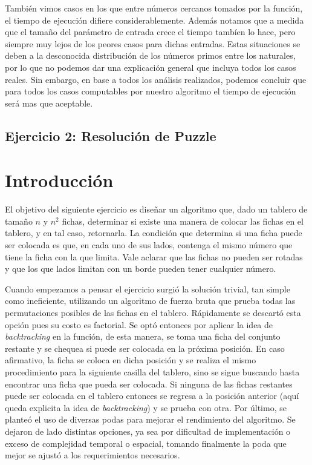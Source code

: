 \documentclass[a4paper,10pt] {article}
\begin{document}
Tambi\'en vimos casos en los que entre n\'umeros cercanos tomados por la funci\'on, el tiempo de ejecuci\'on difiere considerablemente. Adem\'as notamos que a medida que el tama\~{n}o del par\'ametro de entrada crece el tiempo tamb\'ien lo hace, pero siempre muy lejos de los peores casos para dichas entradas. Estas situaciones se deben a la desconocida distribuci\'on de los n\'umeros primos entre los naturales, por lo que no podemos dar una explicaci\'on general que incluya todos los casos reales. Sin embargo, en base a todos los an\'alisis realizados, podemos concluir que para todos los casos computables por nuestro algoritmo el tiempo de ejecuci\'on ser\'a mas que aceptable.

\bigskip

\begin{center}
\section*{Ejercicio 2: Resoluci\'on de Puzzle}
\end{center}

\bigskip
\section*{Introducci\'on}

El objetivo del siguiente ejercicio es diseñar un algoritmo que, dado un tablero de tama\~{n}o $n$ y $n^{2}$ fichas, determinar si existe una manera de colocar las fichas en el tablero, y en tal caso, retornarla. La condici\'on que determina si una ficha puede ser colocada es que, en cada uno de sus lados, contenga el mismo n\'umero que tiene la ficha con la que limita. Vale aclarar que las fichas no pueden ser rotadas y que los que lados limitan con un borde pueden tener cualquier n\'umero.

Cuando empezamos a pensar el ejercicio surgi\'o la soluci\'on trivial, tan simple como ineficiente, utilizando un algoritmo de fuerza bruta que prueba todas las permutaciones posibles de las fichas en el tablero. R\'apidamente se descart\'o esta opci\'on pues su costo es factorial. Se opt\'o entonces por aplicar la idea de \textit{backtracking} en la funci\'on, de esta manera, se toma una ficha del conjunto restante y se chequea si puede ser colocada en la pr\'oxima posici\'on. En caso afirmativo, la ficha se coloca en dicha posici\'on y se realiza el mismo procedimiento para la siguiente casilla del tablero, sino se sigue buscando hasta encontrar una ficha que pueda ser colocada. Si ninguna de las fichas restantes puede ser colocada en el tablero entonces se regresa a la posici\'on anterior (aqu\'i queda explicita la idea de \textit{backtracking}) y se prueba con otra. Por \'ultimo, se plante\'o el uso de diversas podas para mejorar el rendimiento del algoritmo. Se dejaron de lado distintas opciones, ya sea por dificultad de implementaci\'on o exceso de complejidad temporal o espacial, tomando finalmente la poda que mejor se ajust\'o a los requerimientos necesarios.
\end{document}
